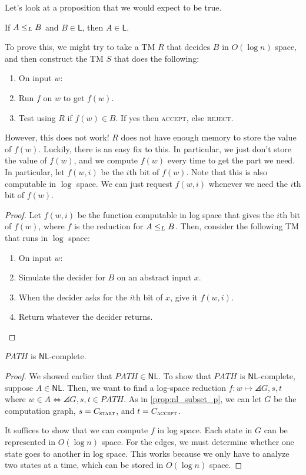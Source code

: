 \documentclass{standalone}
\begin{document}
Let's look at a proposition that we would expect to be true.
\begin{proposition}
  If \(A \mathrel{\leq_L} B\) and \(B \in \mathsf{L}\), then \(A \in \mathsf{L}\).
\end{proposition}
To prove this, we might try to take a \textsf{TM} \(R\) that decides \(B\) in \(O(\log n)\) space, and then construct the \textsf{TM} \(S\) that does the following:
\begin{enumerate}[start=0]
  \item On input \(w\):
  \item Run \(f\) on \(w\) to get \(f(w)\).
  \item Test using \(R\) if \(f(w) \in B\). If yes then \textsc{accept}, else \textsc{reject}.
\end{enumerate}
However, this does not work! \(R\) does not have enough memory to store the value of \(f(w)\). Luckily, there is an easy fix to this. In particular, we just don't store the value of \(f(w)\), and we compute \(f(w)\) every time to get the part we need. In particular, let \(f(w, i)\) be the \(i\)th bit of \(f(w)\). Note that this is also computable in \(\log\) space. We can just request \(f(w, i)\) whenever we need the \(i\)th bit of \(f(w)\).
\begin{proof}
  Let \(f(w, i)\) be the function computable in log space that gives the \(i\)th bit of \(f(w)\), where \(f\) is the reduction for \(A \mathrel{\leq_L} B\). Then, consider the following \textsf{TM} that runs in \(\log\) space:
  \begin{enumerate}[start=0]
    \item On input \(w\):
    \item Simulate the decider for \(B\) on an abstract input \(x\).
    \item When the decider asks for the \(i\)th bit of \(x\), give it \(f(w, i)\).
    \item Return whatever the decider returns.\qedhere
  \end{enumerate}
\end{proof}

\begin{theorem}
  \(\textit{PATH}\) is \(\mathsf{NL}\)-complete.
\end{theorem}
\begin{proof}
  We showed earlier that \(\textit{PATH} \in \mathsf{NL}\). To show that \(\textit{PATH}\) is \(\mathsf{NL}\)-complete, suppose \(A \in \mathsf{NL}\). Then, we want to find a log-space reduction \(f \colon w \mapsto \angles{G, s, t}\) where \(w \in A \iff \angles{G, s, t} \in \textit{PATH}\). As in \cref{prop:nl_subset_p}, we can let \(G\) be the computation graph, \(s = C_{\textsc{start}}\), and \(t = C_{\textsc{accept}}\).

  It suffices to show that we can compute \(f\) in log space. Each state in \(G\) can be represented in \(O(\log n)\) space. For the edges, we must determine whether one state goes to another in log space. This works because we only have to analyze two states at a time, which can be stored in \(O(\log n)\) space.
\end{proof}
\end{document}
